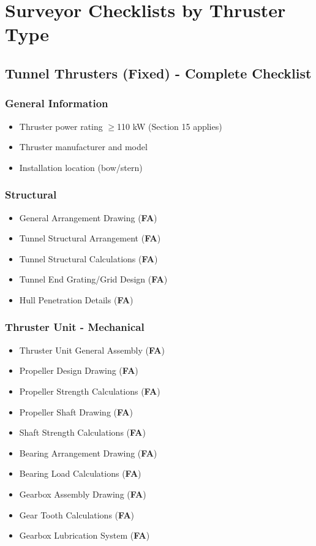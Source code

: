 \documentclass[11pt,a4paper]{report}
\newcommand{\fa}{\textbf{\textcolor{warningred}{FA}}}
\begin{document}
\newpage

\chapter{Surveyor Checklists by Thruster Type}
\label{ch:checklists}

\section{Tunnel Thrusters (Fixed) - Complete Checklist}

\subsection{General Information}
\begin{itemize}[label=$\square$]
\item Thruster power rating $\geq$110 kW (Section 15 applies)
\item Thruster manufacturer and model
\item Installation location (bow/stern)
\end{itemize}

\subsection{Structural}
\begin{itemize}[label=$\square$]
\item General Arrangement Drawing (\fa{})
\item Tunnel Structural Arrangement (\fa{})
\item Tunnel Structural Calculations (\fa{})
\item Tunnel End Grating/Grid Design (\fa{})
\item Hull Penetration Details (\fa{})
\end{itemize}

\subsection{Thruster Unit - Mechanical}
\begin{itemize}[label=$\square$]
\item Thruster Unit General Assembly (\fa{})
\item Propeller Design Drawing (\fa{})
\item Propeller Strength Calculations (\fa{})
\item Propeller Shaft Drawing (\fa{})
\item Shaft Strength Calculations (\fa{})
\item Bearing Arrangement Drawing (\fa{})
\item Bearing Load Calculations (\fa{})
\item Gearbox Assembly Drawing (\fa{})
\item Gear Tooth Calculations (\fa{})
\item Gearbox Lubrication System (\fa{})
\end{itemize}
\end{document}
